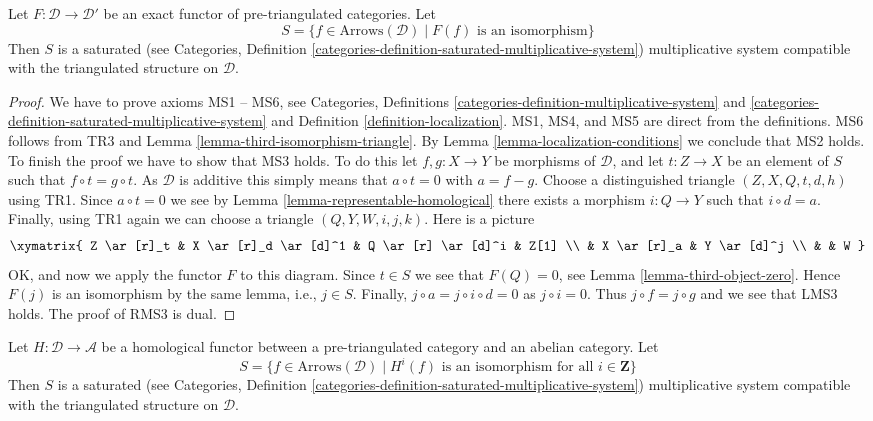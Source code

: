 \begin{lemma}
\label{lemma-triangle-functor-localize}
Let $F : \mathcal{D} \to \mathcal{D}'$ be an exact functor of
pre-triangulated categories.  Let
$$
S = \{f \in \text{Arrows}(\mathcal{D})
\mid F(f)\text{ is an isomorphism}\}
$$
Then $S$ is a saturated (see
Categories,
Definition \ref{categories-definition-saturated-multiplicative-system})
multiplicative system compatible with the
triangulated structure on $\mathcal{D}$.
\end{lemma}

\begin{proof}
We have to prove axioms MS1 -- MS6, see
Categories, Definitions \ref{categories-definition-multiplicative-system} and
\ref{categories-definition-saturated-multiplicative-system}
and
Definition \ref{definition-localization}.
MS1, MS4, and MS5 are direct from the definitions. MS6 follows from TR3 and
Lemma \ref{lemma-third-isomorphism-triangle}.
By
Lemma \ref{lemma-localization-conditions}
we conclude that MS2 holds. To finish the proof we have to show that
MS3 holds. To do this let $f, g : X \to Y$ be morphisms of $\mathcal{D}$,
and let $t : Z \to X$ be an element of $S$ such that $f \circ t = g \circ t$.
As $\mathcal{D}$ is additive this simply means that $a \circ t = 0$ with
$a = f - g$. Choose a distinguished triangle $(Z, X, Q, t, d, h)$ using TR1.
Since $a \circ t = 0$ we see by
Lemma \ref{lemma-representable-homological}
there exists a morphism $i : Q \to Y$ such that $i \circ d = a$.
Finally, using TR1 again we can choose a triangle
$(Q, Y, W, i, j, k)$. Here is a picture
$$
\xymatrix{
Z \ar[r]_t & X \ar[r]_d \ar[d]^1 & Q \ar[r] \ar[d]^i & Z[1] \\
& X \ar[r]_a & Y \ar[d]^j \\
& & W
}
$$
OK, and now we apply the functor $F$ to this diagram.
Since $t \in S$ we see that $F(Q) = 0$, see
Lemma \ref{lemma-third-object-zero}.
Hence $F(j)$ is an isomorphism by the same lemma, i.e., $j \in S$.
Finally, $j \circ a = j \circ i \circ d = 0$ as $j \circ i = 0$.
Thus $j \circ f = j \circ g$ and we see that LMS3 holds.
The proof of RMS3 is dual.
\end{proof}

\begin{lemma}
\label{lemma-homological-functor-localize}
Let $H : \mathcal{D} \to \mathcal{A}$ be a homological functor between a
pre-triangulated category and an abelian category. Let
$$
S = \{f \in \text{Arrows}(\mathcal{D})
\mid H^i(f)\text{ is an isomorphism for all }i \in \mathbf{Z}\}
$$
Then $S$ is a saturated (see
Categories,
Definition \ref{categories-definition-saturated-multiplicative-system})
multiplicative system compatible with the
triangulated structure on $\mathcal{D}$.
\end{lemma}

